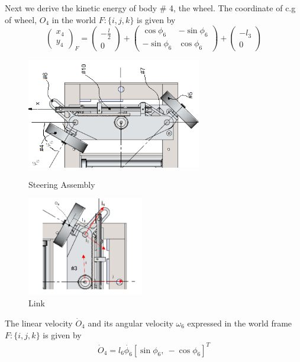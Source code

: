 { 
 Next we derive the kinetic energy of body \# 4, the wheel. 
 The coordinate of c.g of wheel, $O_4$ in the world  $F:\{i,j,k\}$  is given by \[ \begin{pmatrix}
x_{4}\\y_{4} \end{pmatrix}_F
= \begin{pmatrix}-\frac{l}{2} \\0
\end{pmatrix}+
\begin{pmatrix}
		\cos\phi_6 &  -\sin\phi_6\\ -\sin\phi_6 & \cos\phi_6
\end{pmatrix} + 
\begin{pmatrix}
			-l_3\\0
\end{pmatrix}\]
\begin{figure}
	\begin{minipage}[t]{0.5\textwidth}
		\centering
		\includegraphics[width=3in]{Chapter4/fig/SteerModel} 
		\caption{Steering Assembly}\label{fig:SteerAsm}
	\end{minipage}
	\hfill
	\begin{minipage}[t]{0.5\textwidth}
		\centering
		\includegraphics[width=2in]{Chapter4/fig/link} 
		\caption{Link }\label{fig:SteerLink}
	\end{minipage}
\end{figure}
 	
  The linear velocity $\dot{O}_4$  and its angular velocity $\omega_6$  expressed in the world frame $F:\{i,j,k\}$ is given by
 \begin{eqnarray}
 \dot{O}_4=l_6\dot{\phi_6}[\sin\phi_6, ~ -\cos\phi_6] ^T
 \end{eqnarray}
 
}
